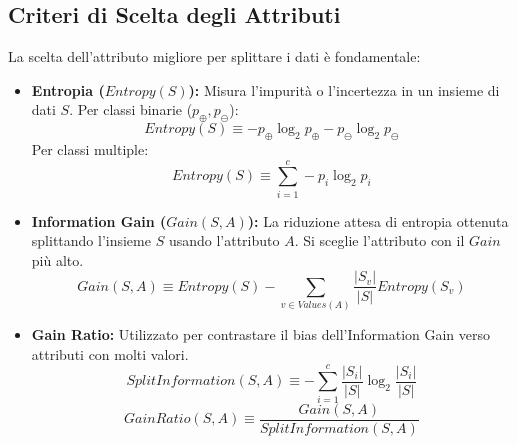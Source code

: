 \documentclass[a4paper,11pt]{article}
\begin{document}
\subsection{Criteri di Scelta degli Attributi}
La scelta dell'attributo migliore per splittare i dati è fondamentale:
\begin{itemize}
    \item \textbf{Entropia ($Entropy(S)$):} Misura l'impurità o l'incertezza in un insieme di dati $S$. Per classi binarie ($p_\oplus, p_\ominus$):
    \begin{equation}
        Entropy(S) \equiv -p_{\oplus} \log_2 p_{\oplus} - p_{\ominus} \log_2 p_{\ominus}
    \end{equation}
    Per classi multiple:
    \begin{equation}
        Entropy(S) \equiv \sum_{i=1}^c -p_i \log_2 p_i
    \end{equation}
    \item \textbf{Information Gain ($Gain(S, A)$):} La riduzione attesa di entropia ottenuta splittando l'insieme $S$ usando l'attributo $A$. Si sceglie l'attributo con il $Gain$ più alto.
    \begin{equation}
        Gain(S, A) \equiv Entropy(S) - \sum_{v \in Values(A)} \frac{|S_v|}{|S|} Entropy(S_v)
    \end{equation}
    \item \textbf{Gain Ratio:} Utilizzato per contrastare il bias dell'Information Gain verso attributi con molti valori.
    \begin{equation}
        SplitInformation(S, A) \equiv - \sum_{i=1}^c \frac{|S_i|}{|S|} \log_2 \frac{|S_i|}{|S|}
    \end{equation}
    \begin{equation}
        GainRatio(S, A) \equiv \frac{Gain(S, A)}{SplitInformation(S, A)}
    \end{equation}
\end{itemize}
\end{document}
